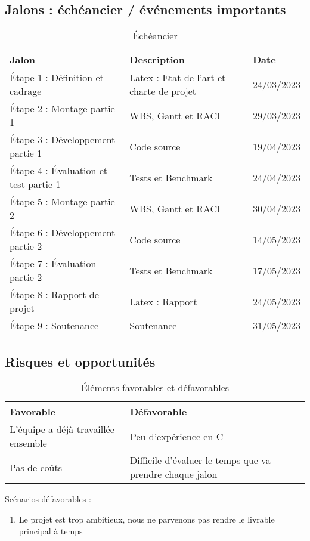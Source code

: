 \documentclass[12pt]{report}
\begin{document}
    \subsection{Jalons : échéancier / événements importants}
        \begin{table}[htbp]
            \centering
            \caption{Échéancier}
            \begin{tabular}{|l|l|l|}
                \hline
                \textbf{Jalon} & \textbf{Description} & \textbf{Date} \\
                \hline\hline
                Étape 1 : Définition et cadrage & Latex : Etat de l'art et charte de projet & 24/03/2023 \\
                \hline
                Étape 2 : Montage partie 1 & WBS, Gantt et RACI & 29/03/2023 \\
                \hline
                Étape 3 : Développement partie 1 & Code source & 19/04/2023 \\
                \hline
                Étape 4 : Évaluation et test partie 1 & Tests et Benchmark & 24/04/2023 \\
                \hline
                Étape 5 : Montage partie 2 & WBS, Gantt et RACI & 30/04/2023 \\
                \hline
                Étape 6 : Développement partie 2 & Code source & 14/05/2023 \\
                \hline
                Étape 7 : Évaluation partie 2 & Tests et Benchmark & 17/05/2023 \\
                \hline
                Étape 8 : Rapport de projet & Latex : Rapport & 24/05/2023 \\
                \hline
                Étape 9 : Soutenance & Soutenance & 31/05/2023 \\
                \hline                
            \end{tabular}
        \end{table}
    \subsection{Risques et opportunités}
        \begin{table}[htbp]
            \centering
            \caption{Éléments favorables et défavorables}
            \begin{tabular}{|l|l|}
                \hline
                \textbf{Favorable} & \textbf{Défavorable} \\
                \hline\hline
                L'équipe a déjà travaillée ensemble & Peu d'expérience en C \\
                Pas de coûts & Difficile d'évaluer le temps que va prendre chaque jalon \\
                \hline
            \end{tabular}
        \end{table}

        \bigskip
        Scénarios défavorables :
        \begin{enumerate}
            \item Le projet est trop ambitieux, nous ne parvenons pas rendre le livrable principal à temps
        \end{enumerate}
\end{document}
